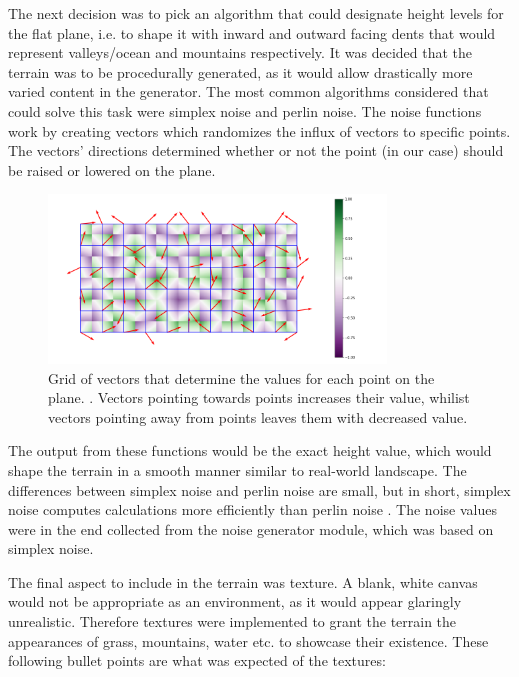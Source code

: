 The next decision was to pick an algorithm that could designate height levels for the flat plane, i.e. to shape it with inward and outward facing dents that would represent valleys/ocean and mountains respectively.
It was decided that the terrain was to be procedurally generated, as it would allow drastically more varied content in the generator.
The most common algorithms considered that could solve this task were simplex noise and perlin noise.
The noise functions work by creating vectors which randomizes the influx of vectors to specific points.
The vectors’ directions determined whether or not the point (in our case) should be raised or lowered on the plane.
\begin{figure}[h!]
  \centering

  \includegraphics[width=0.8\textwidth]{figure/perlin_noise_gradient_grid.png}
  \caption{Grid of vectors that determine the values for each point on the plane. \cite{noise_grid_img}. Vectors pointing towards points increases their value, whilist vectors pointing away from points leaves them with decreased value.}

  \label{fig:noise_grid}
\end{figure}
The output from these functions would be the exact height value, which would shape the terrain in a smooth manner similar to real-world landscape.
The differences between simplex noise and perlin noise are small, but in short, simplex noise computes calculations more efficiently than perlin noise \cite{simplexnoise_stefan}.
The noise values were in the end collected from the noise generator module, which was based on simplex noise.

The final aspect to include in the terrain was texture.
A blank, white canvas would not be appropriate as an environment, as it would appear glaringly unrealistic.
Therefore textures were implemented to grant the terrain the appearances of grass, mountains, water etc. to showcase their existence.
These following bullet points are what was expected of the textures:

